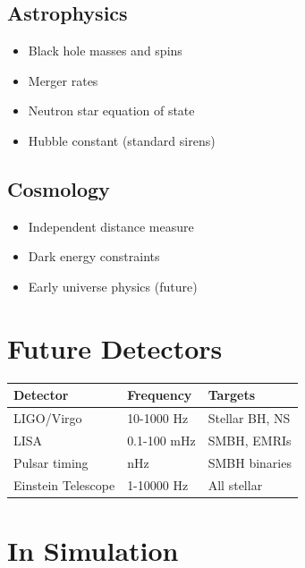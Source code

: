 \documentclass[
  11pt,
  letterpaper,
  twoside,
  openright]{book}
\providecommand{\tightlist}{%
  \setlength{\itemsep}{0pt}\setlength{\parskip}{0pt}}
\begin{document}
\subsection{Astrophysics}\label{astrophysics}

\begin{itemize}
\tightlist
\item
  Black hole masses and spins
\item
  Merger rates
\item
  Neutron star equation of state
\item
  Hubble constant (standard sirens)
\end{itemize}

\subsection{Cosmology}\label{cosmology}

\begin{itemize}
\tightlist
\item
  Independent distance measure
\item
  Dark energy constraints
\item
  Early universe physics (future)
\end{itemize}

\section{Future Detectors}\label{future-detectors}

\begin{longtable}[]{@{}lll@{}}
\toprule\noalign{}
Detector & Frequency & Targets \\
\midrule\noalign{}
\endhead
\bottomrule\noalign{}
\endlastfoot
LIGO/Virgo & 10-1000 Hz & Stellar BH, NS \\
LISA & 0.1-100 mHz & SMBH, EMRIs \\
Pulsar timing & nHz & SMBH binaries \\
Einstein Telescope & 1-10000 Hz & All stellar \\
\end{longtable}

\section{In Simulation}\label{in-simulation-23}
\end{document}
